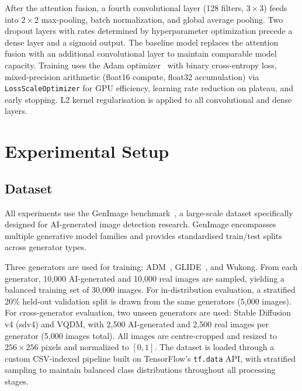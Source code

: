 \documentclass[runningheads]{llncs}
\begin{document}
After the attention fusion, a fourth convolutional layer (128 filters, $3 \times 3$) feeds into $2 \times 2$ max-pooling, batch normalization, and global average pooling. Two dropout layers with rates determined by hyperparameter optimization precede a dense layer and a sigmoid output. The baseline model replaces the attention fusion with an additional convolutional layer to maintain comparable model capacity. Training uses the Adam optimizer~\cite{kingma2015adam} with binary cross-entropy loss, mixed-precision arithmetic (float16 compute, float32 accumulation) via \texttt{LossScaleOptimizer} for GPU efficiency, learning rate reduction on plateau, and early stopping. L2 kernel regularisation is applied to all convolutional and dense layers.


\section{Experimental Setup}

\subsection{Dataset}

All experiments use the GenImage benchmark~\cite{zhu2023genimage}, a large-scale dataset specifically designed for AI-generated image detection research. GenImage encompasses multiple generative model families and provides standardised train/test splits across generator types.

Three generators are used for training: ADM~\cite{dhariwal2021diffusion}, GLIDE~\cite{nichol2022glide}, and Wukong. From each generator, 10{,}000 AI-generated and 10{,}000 real images are sampled, yielding a balanced training set of 30{,}000 images. For in-distribution evaluation, a stratified 20\% held-out validation split is drawn from the same generators (5{,}000 images). For cross-generator evaluation, two unseen generators are used: Stable Diffusion v4 (sdv4) and VQDM, with 2{,}500 AI-generated and 2{,}500 real images per generator (5{,}000 images total). All images are centre-cropped and resized to $256 \times 256$ pixels and normalized to $[0, 1]$. The dataset is loaded through a custom CSV-indexed pipeline built on TensorFlow's \texttt{tf.data} API, with stratified sampling to maintain balanced class distributions throughout all processing stages.
\end{document}
